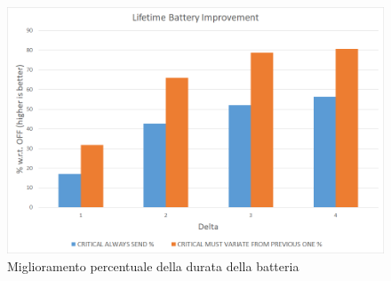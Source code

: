     \begin{figure}
      \centering
      \includegraphics[width=\linewidth]{../Immagini/GraficoBatteryLifetimePercentage.png}
      \caption{Miglioramento percentuale della durata della batteria}
      \label{fig:BatteryLifetimePercentage}
    \end{figure}
